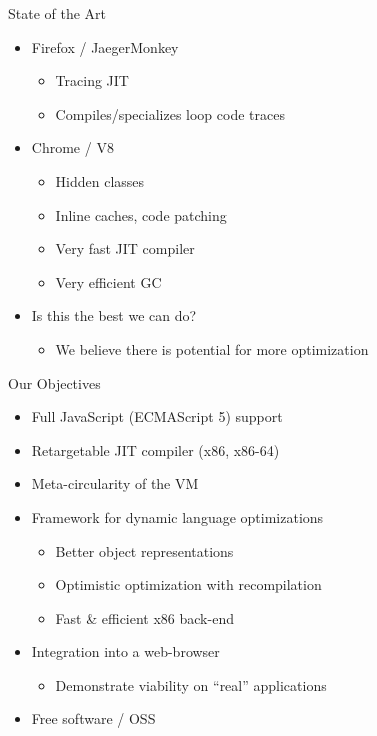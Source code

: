 \begin{frame}{State of the Art}
    \begin{itemize}
        \item Firefox / JaegerMonkey
        \begin{itemize}
            \item Tracing JIT
            \item Compiles/specializes loop code traces
        \end{itemize}

        \item Chrome / V8
        \begin{itemize}
            \item Hidden classes
            \item Inline caches, code patching
            \item Very fast JIT compiler
            \item Very efficient GC
        \end{itemize}

        \item Is this the best we can do?
        \begin{itemize}
            \item We believe there is potential for more optimization
        \end{itemize}
    \end{itemize}
\end{frame}

\begin{frame}{Our Objectives}
    \begin{itemize}
        \item Full JavaScript (ECMAScript 5) support
        \item Retargetable JIT compiler (x86, x86-64)
        \item Meta-circularity of the VM
        \item Framework for dynamic language optimizations
        \begin{itemize}
            \item Better object representations
            \item Optimistic optimization with recompilation
            \item Fast \& efficient x86 back-end
        \end{itemize}
        \item Integration into a web-browser
        \begin{itemize}
            \item Demonstrate viability on “real” applications
        \end{itemize}
        \item Free software / OSS
    \end{itemize}
\end{frame}

